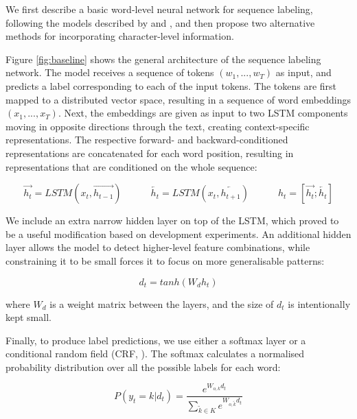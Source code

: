 \documentclass[11pt]{article}
\begin{document}
We first describe a basic word-level neural network for sequence labeling, following the models described by  and , and then propose two alternative methods for incorporating character-level information.

Figure \ref{fig:baseline} shows the general architecture of the sequence labeling network. The model receives a sequence of tokens $(w_1, ..., w_T)$ as input, and predicts a label corresponding to each of the input tokens.
The tokens are first mapped to a distributed vector space, resulting in a sequence of word embeddings $(x_1, ..., x_T)$.
Next, the embeddings are given as input to two LSTM \cite{Hochreiter1997} components moving in opposite directions through the text, creating context-specific representations. The respective forward- and backward-conditioned representations are concatenated for each word position, resulting in representations that are conditioned on the whole sequence:

\begin{equation}
\overrightarrow{h_t} = LSTM(x_t, \overrightarrow{h_{t-1}})\hspace{3em}
\overleftarrow{h_t} = LSTM(x_t, \overleftarrow{h_{t+1}})\hspace{3em}
h_t = [\overrightarrow{h_t};\overleftarrow{h_t}]
\end{equation}

We include an extra narrow hidden layer on top of the LSTM, which proved to be a useful modification based on development experiments. An additional hidden layer allows the model to detect higher-level feature combinations, while constraining it to be small forces it to focus on more generalisable patterns:

\begin{equation}
d_t = tanh(W_d h_t)
\end{equation}

\noindent where $W_d$ is a weight matrix between the layers, and the size of $d_t$ is intentionally kept small.

Finally, to produce label predictions, we use either a softmax layer or a conditional random field (CRF, ). The softmax calculates a normalised probability distribution over all the possible labels for each word:

\begin{equation}
P(y_t = k | d_t) = \frac{e^{W_{o,k} d_t}}{\sum_{\tilde{k} \in K} e^{W_{o,\tilde{k}} d_t}}
\end{equation}
\end{document}
